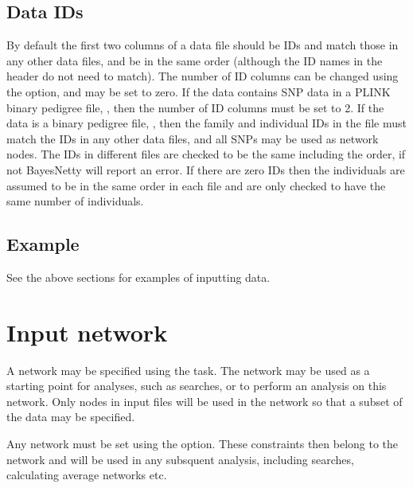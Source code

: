 \documentclass[letterpaper,10pt,english]{sphinxmanual}
\begin{document}
\subsection{Data IDs}
\label{\detokenize{input-data:data-ids}}\label{\detokenize{input-data:input-data-ids}}
\sphinxAtStartPar
By default the first two columns of a data file should be IDs and match those in any other data files, and be in the same order (although the ID names in the header do not need to match).
The number of ID columns can be changed using the  option, and may be set to zero.
If the data contains SNP data in a PLINK binary pedigree file, , then the number of ID columns must be set to 2.
If the data is a binary pedigree file, , then the family and individual IDs in the file  must match the IDs in any other data files, and all SNPs may be used as network nodes.
The IDs in different files are checked to be the same including the order, if not BayesNetty will report an error.
If there are zero IDs then the individuals are assumed to be in the same order in each file and are only checked to have the same number of individuals.


\subsection{Example}
\label{\detokenize{input-data:example}}\label{\detokenize{input-data:input-data-example}}
\sphinxAtStartPar
See the above sections for examples of inputting data.

\sphinxstepscope


\section{Input network}
\label{\detokenize{input-network:input-network}}\label{\detokenize{input-network:id1}}\label{\detokenize{input-network::doc}}
\sphinxAtStartPar
A network may be specified using the  task. The network may be used as a starting point for analyses, such as searches, or to perform an analysis on this network.
Only nodes in input files will be used in the network so that a subset of the data may be specified.

\sphinxAtStartPar
Any network  must be set using the  option.
These constraints then belong to the network and will be used in any subsquent analysis, including searches, calculating average networks etc.
\end{document}
